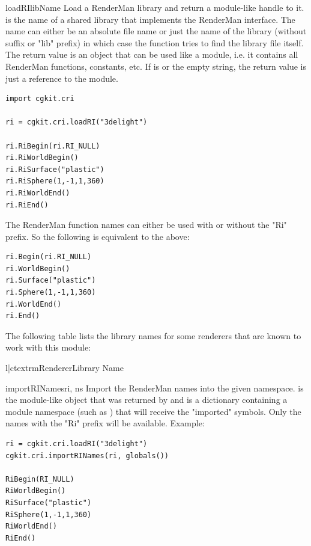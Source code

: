 \begin{funcdesc}{loadRI}{libName}
Load a RenderMan library and return a module-like handle to it.    
 is the name of a shared library that implements the RenderMan
interface. The name can either be an absolute file name or just the
name of the library (without suffix or "lib" prefix) in which case the
function tries to find the library file itself. The return value is
an object that can be used like a module, i.e. it contains all RenderMan
functions, constants, etc.
If  is  or the empty string, the return value is
just a reference to the  module.

\begin{verbatim}
import cgkit.cri

ri = cgkit.cri.loadRI("3delight")

ri.RiBegin(ri.RI_NULL)
ri.RiWorldBegin()
ri.RiSurface("plastic")
ri.RiSphere(1,-1,1,360)
ri.RiWorldEnd()
ri.RiEnd()
\end{verbatim}

The RenderMan function names can either be used with or without the
"Ri" prefix. So the following is equivalent to the above:

\begin{verbatim}
ri.Begin(ri.RI_NULL)
ri.WorldBegin()
ri.Surface("plastic")
ri.Sphere(1,-1,1,360)
ri.WorldEnd()
ri.End()
\end{verbatim}

The following table lists the library names for some renderers that are known to
work with this module:

\begin{tableii}{l|c}{textrm}{Renderer}{Library Name}
\end{tableii}

\end{funcdesc}

\begin{funcdesc}{importRINames}{ri, ns}
Import the RenderMan names into the given namespace.
 is the module-like object that was returned by 
and  is a dictionary containing a module namespace (such as 
) that will receive the "imported" symbols. Only
the names with the "Ri" prefix will be available. Example:

\begin{verbatim}
ri = cgkit.cri.loadRI("3delight")
cgkit.cri.importRINames(ri, globals())

RiBegin(RI_NULL)
RiWorldBegin()
RiSurface("plastic")
RiSphere(1,-1,1,360)
RiWorldEnd()
RiEnd()
\end{verbatim}
\end{funcdesc}

